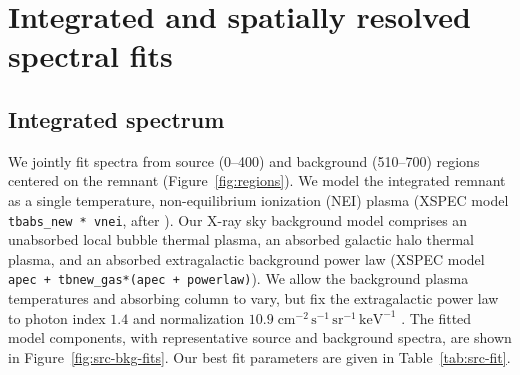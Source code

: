 \documentclass[preprint2,tighten,trackchanges]{aastex6}
\newcommand*{\mt}{\mathrm}
\newcommand*{\unit}[1]{\;\mt{#1}}  %
\begin{document}
\section{Integrated and spatially resolved spectral fits} \label{sec:spec}

\subsection{Integrated spectrum} \label{sec:src-bkg}

\begin{figure*}[]
    \label{fig:regions}
\end{figure*}

We jointly fit spectra from source (0--400\arcsec) and background
(510--700\arcsec) regions centered on the remnant (Figure~\ref{fig:regions}).
We model the integrated remnant as a single temperature, non-equilibrium
ionization (NEI) plasma (XSPEC model \texttt{tbabs\_new * vnei}, after
\citet{hamilton1983}).  %
Our X-ray sky background model comprises an unabsorbed local bubble thermal
plasma, an absorbed galactic halo thermal plasma, and an absorbed extragalactic
background power law (XSPEC model \texttt{apec + tbnew\_gas*(apec + powerlaw)}).
We allow the background plasma temperatures and absorbing column to vary, but
fix the extragalactic power law to photon index $1.4$ and normalization
$10.9 \unit{cm^{-2}\, s^{-1}\, sr^{-1}\, keV^{-1}}$ \citep{hickox2006}.
The fitted model components, with representative source and background spectra,
are shown in Figure~\ref{fig:src-bkg-fits}.
Our best fit parameters are given in Table~\ref{tab:src-fit}.

\begin{figure*}[!ht]
    \label{fig:src-bkg-fits}
\end{figure*}
\end{document}
